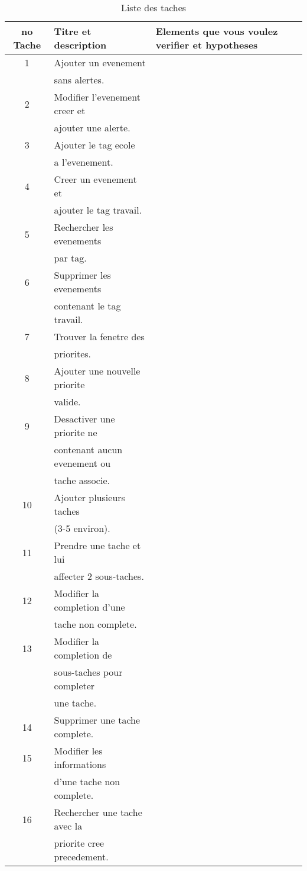 \documentclass[letterpaper, oneside, 12pt, these, creativecommons]{thETS}
\begin{document}
\begin{table}
	\centering
	\begin{tabular}{|c|l|l|}
		\hline
		no Tache	& Titre et description		& Elements que vous voulez verifier et hypotheses 	\\ \hline 
		1		& Ajouter un evenement		&  							\\ 
				& sans alertes.			&							\\ \hline
		2		& Modifier l'evenement creer et	&							\\
				& ajouter une alerte.		&							\\ \hline
		3		& Ajouter le tag ecole		&							\\
				& a l'evenement.		&							\\ \hline
		4		& Creer un evenement et		&							\\
				& ajouter le tag travail.	&							\\ \hline
		5		& Rechercher les evenements	& 							\\
				& par tag.			&							\\ \hline
		6		& Supprimer les evenements	&							\\
				& contenant le tag travail.	&							\\ \hline
		7		& Trouver la fenetre des	&							\\
				& priorites.			& 							\\ \hline
		8		& Ajouter une nouvelle priorite &							\\
				& valide.			&							\\ \hline
		9		& Desactiver une priorite ne	&							\\
				& contenant aucun evenement ou 	&							\\
				& tache associe.		&							\\ \hline
		10		& Ajouter plusieurs taches	&							\\
				& (3-5 environ).		&							\\ \hline
		11		& Prendre une tache et lui	&							\\
				& affecter 2 sous-taches.	&							\\ \hline
		12		& Modifier la completion d'une	&							\\
				& tache non complete.		&							\\ \hline
		13		& Modifier la completion de	&							\\
				& sous-taches pour completer	&							\\ 
				& une tache.			&							\\ \hline
		14		& Supprimer une tache complete.	&							\\ \hline
		15		& Modifier les informations	&							\\
				& d'une tache non complete.	&							\\ \hline
		16		& Rechercher une tache avec la 	&							\\
				& priorite cree precedement.	& 							\\ \hline
	\end{tabular}
	\caption{Liste des taches}
\end{table}
\end{document}
